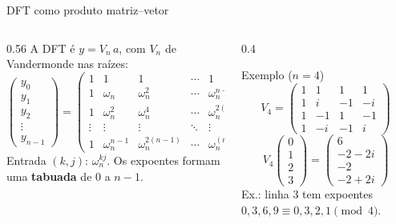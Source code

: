 \documentclass[aspectratio=169,10pt]{beamer}
\newcommand{\w}[2][n]{\omega_{#1}^{#2}}       %
\begin{document}
\begin{frame}{DFT como produto matriz--vetor}
  \begin{columns}[T]
    \begin{column}{0.56\textwidth}
      \small
      A DFT é $y = V_n\,a$, com $V_n$ de Vandermonde nas raízes:
      \[
        \begin{pmatrix} y_0\\ y_1\\ y_2\\ \vdots\\ y_{n-1}\end{pmatrix}
        =
        \begin{pmatrix}
          1 & 1 & 1 & \cdots & 1\\
          1 & \omega_n & \w{2} & \cdots & \w{n-1}\\
          1 & \w{2} & \w{4} & \cdots & \w{2(n-1)}\\
          \vdots & \vdots & \vdots & \ddots & \vdots\\
          1 & \w{n-1} & \w{2(n-1)} & \cdots & \w{(n-1)(n-1)}
        \end{pmatrix}
        \begin{pmatrix} a_0\\ a_1\\ a_2\\ \vdots\\ a_{n-1}\end{pmatrix}
      \]
      Entrada $(k,j)$: $\w{kj}$. Os expoentes formam uma
      \textbf{tabuada} de $0$ a $n-1$.
    \end{column}
    \begin{column}{0.4\textwidth}
      \begin{exampleblock}{Exemplo ($n=4$)}
        \[
          V_4 = \begin{pmatrix}
            1 & 1 & 1 & 1\\
            1 & i & -1 & -i\\
            1 & -1 & 1 & -1\\
            1 & -i & -1 & i
          \end{pmatrix}
        \]
        \[
          V_4 \begin{pmatrix}0\\1\\2\\3\end{pmatrix}
          = \begin{pmatrix}6\\ -2-2i\\ -2\\ -2+2i\end{pmatrix}
        \]
        {\small Ex.: linha 3 tem expoentes $0,3,6,9 \equiv 0,3,2,1 \pmod 4$.}
      \end{exampleblock}
    \end{column}
  \end{columns}
\end{frame}
\end{document}
